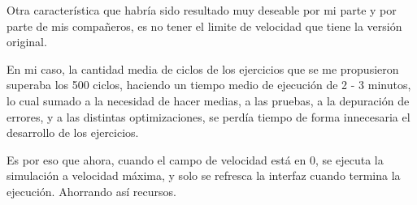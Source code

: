 Otra característica que habría sido resultado muy deseable por mi parte y por parte de mis compañeros, 
es no tener el limite de velocidad que tiene la versión original.

\bigskip
En mi caso, la cantidad media de ciclos de los ejercicios que se me propusieron superaba los 500 ciclos,
 haciendo un tiempo medio de ejecución de 2 - 3 minutos, lo cual sumado a la necesidad de hacer medias,
 a las pruebas, a la depuración de errores, y a las distintas optimizaciones, 
se perdía tiempo de forma innecesaria el desarrollo de los ejercicios.

\bigskip
Es por eso que ahora, cuando el campo de velocidad está en 0, se ejecuta la simulación a velocidad 
máxima, y solo se refresca la interfaz cuando termina la ejecución. Ahorrando así 
recursos. 